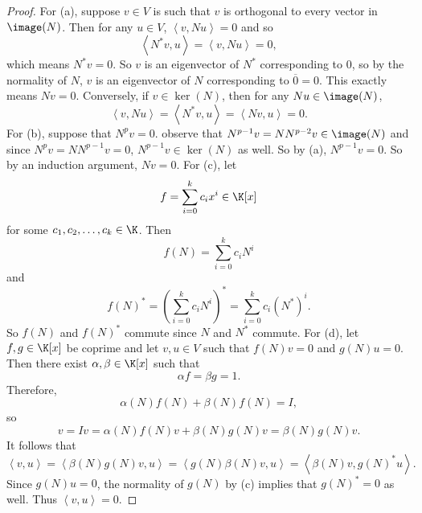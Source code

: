 \documentclass[linearalgebra]{subfiles}
\begin{document}
    \begin{proof}
        For (a), suppose $v\in V$ is such that $v$ is orthogonal to every vector in $\image(N)$. Then for any $u\in V$, $\left\langle v, Nu\right\rangle =0$ and so
        \begin{equation*}
            \left\langle N^{*} v, u\right\rangle = \left\langle v, Nu\right\rangle = 0,
        \end{equation*}
        which means $N^{*} v = 0$. So $v$ is an eigenvector of $N^{*} $ corresponding to $0$, so by the normality of $N$, $v$ is an eigenvector of $N$ corresponding to $\overline{0} =0$. This exactly means $Nv = 0$. Conversely, if $v\in\ker(N)$, then for any $Nu\in\image(N)$,
        \begin{equation*}
            \left\langle v, Nu\right\rangle = \left\langle N^{*} v, u\right\rangle = \left\langle Nv, u\right\rangle = 0. 
        \end{equation*}
        For (b), suppose that $N^pv = 0$. observe that $N^{p-1}v=NN^{p-2}v\in\image(N)$ and since $N^{p}v = NN^{p-1}v = 0$, $N^{p-1}v\in\ker(N)$ as well. So by (a), $N^{p-1}v = 0$. So by an induction argument, $Nv = 0$. For (c), let
        \begin{equation*}
            f = \sum^{k}_{i=0} c_ix^i\in\K[x]
        \end{equation*}
        for some $c_1,c_2,\ldots,c_k\in\K$. Then
        \begin{equation*}
            f(N) = \sum^{k}_{i=0} c_iN^i
        \end{equation*}
        and
        \begin{equation*}
            f(N)^* = \left( \sum^{k}_{i=0} c_iN^i \right) ^{*} = \sum^{k}_{i=0} c_i\left( N^{*} \right) ^i.
        \end{equation*}
        So $f(N)$ and $f(N)^{*} $ commute since $N$ and $N^{*} $ commute. For (d), let $f,g\in\K[x]$ be coprime and let $v,u\in V$ such that $f(N)v = 0$ and $g(N)u=0$. Then there exist $\alpha,\beta\in\K[x]$ such that
        \begin{equation*}
            \alpha f = \beta g = 1.
        \end{equation*}
        Therefore,
        \begin{equation*}
            \alpha(N)f(N) + \beta(N)f(N) = I,
        \end{equation*}
        so
        \begin{equation*}
            v = Iv = \alpha(N)f(N)v + \beta(N)g(N)v = \beta(N)g(N)v.
        \end{equation*}
        It follows that
        \begin{equation*}
            \left\langle v, u\right\rangle = \left\langle \beta(N)g(N)v, u\right\rangle = \left\langle g(N)\beta(N)v, u\right\rangle = \left\langle \beta(N)v, g(N)^{*} u\right\rangle .
        \end{equation*}
        Since $g(N)u = 0$, the normality of $g(N)$ by (c) implies that $g(N)^{*} = 0$ as well. Thus $\left\langle v, u\right\rangle = 0$.
    \end{proof}
\end{document}
